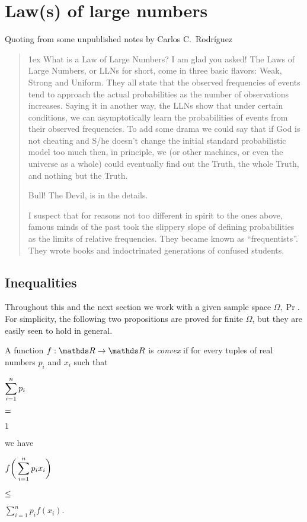 \documentclass[scombinatorics.tex]{subfiles}
\begin{document}
\chapter{Law(s) of large numbers}
\label{ulln}



\def\medrel#1{\parbox[t]{5ex}{$\displaystyle\hfil #1$}}
\def\ceq#1#2#3{\parbox[t]{20ex}{$\displaystyle #1$}\medrel{#2}{$\displaystyle #3$}}

Quoting from some unpublished notes by Carlos C.~Rodr\'iguez

\begin{quotation}\parindent0mm\parskip1ex\noindent
What is a Law of Large Numbers?
I am glad you asked! The Laws of Large Numbers, or LLNs for short, come in
three basic flavors: Weak, Strong and Uniform. They all state that the observed
frequencies of events tend to approach the actual probabilities as the number
of observations increases. Saying it in another way, the LLNs show that under
certain conditions, we can asymptotically learn the probabilities of events from
their observed frequencies. To add some drama we could say that if God is
not cheating and S/he doesn’t change the initial standard probabilistic model
too much then, in principle, we (or other machines, or even the universe as a
whole) could eventually find out the Truth, the whole Truth, and nothing but
the Truth.

Bull! The Devil, is in the details.

I suspect that for reasons not too different in spirit to the ones above, famous
minds of the past took the slippery slope of defining probabilities as the limits
of relative frequencies. They became known as “frequentists”. They wrote
books and indoctrinated generations of confused students.
\end{quotation}

\section{Inequalities}

Throughout this and the next section we work with a given sample space $\Omega,\Pr$.
For simplicity, the following two propositions are proved for finite $\Omega$, but they are easily seen to hold in  general.

\begin{definition}A function $f:\RR\to\RR$ is \emph{convex\/} if for every tuples of real numbers $p_i$ and $x_i$ such that

\ceq{\hfill\sum^n_{i=1}p_i}
{=}
{1}

we have

\ceq{\hfill f\bigg(\sum^n_{i=1}p_ix_i\bigg)}
{\le}
{\sum^n_{i=1}p_if(x_i).}\QED
\end{definition}
\end{document}
